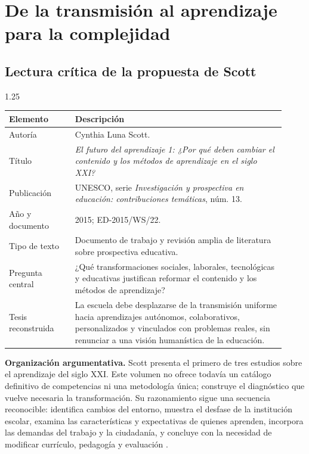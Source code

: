 \documentclass[spanish,letterpaper,oneside]{article}
\begin{document}
\section{De la transmisión al aprendizaje para la complejidad}

\subsection{Lectura crítica de la propuesta de Scott}

\begin{reportelecturabox}
\begin{spacing}{1.25}
\begin{fichalecturabox}
\begin{tabular}{@{}p{0.22\linewidth}p{0.70\linewidth}@{}}
\toprule
\textbf{Elemento} & \textbf{Descripción} \\
\midrule
Autoría & Cynthia Luna Scott. \\
Título & \textit{El futuro del aprendizaje 1: ¿Por qué deben cambiar el contenido y los métodos de aprendizaje en el siglo XXI?} \\
Publicación & UNESCO, serie \textit{Investigación y prospectiva en educación: contribuciones temáticas}, núm. 13. \\
Año y documento & 2015; ED-2015/WS/22. \\
Tipo de texto & Documento de trabajo y revisión amplia de literatura sobre prospectiva educativa. \\
Pregunta central & ¿Qué transformaciones sociales, laborales, tecnológicas y educativas justifican reformar el contenido y los métodos de aprendizaje? \\
Tesis reconstruida & La escuela debe desplazarse de la transmisión uniforme hacia aprendizajes autónomos, colaborativos, personalizados y vinculados con problemas reales, sin renunciar a una visión humanística de la educación. \\
\bottomrule
\end{tabular}
\end{fichalecturabox}

\noindent\textbf{Organización argumentativa.}\enspace
Scott presenta el primero de tres estudios sobre el aprendizaje del siglo XXI. Este volumen no ofrece todavía un catálogo definitivo de competencias ni una metodología única; construye el diagnóstico que vuelve necesaria la transformación. Su razonamiento sigue una secuencia reconocible: identifica cambios del entorno, muestra el desfase de la institución escolar, examina las características y expectativas de quienes aprenden, incorpora las demandas del trabajo y la ciudadanía, y concluye con la necesidad de modificar currículo, pedagogía y evaluación \citep{scott2015futuro}.


\end{spacing}
\end{reportelecturabox}
\end{document}
